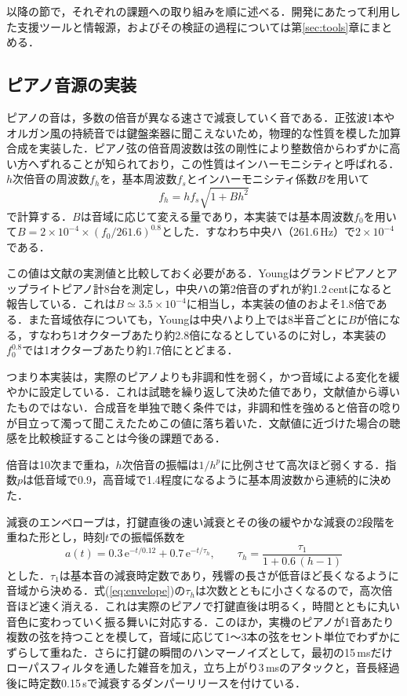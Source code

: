 \documentclass[uplatex,dvipdfmx]{jlreq}
\begin{document}
以降の節で，それぞれの課題への取り組みを順に述べる．開発にあたって利用した支援ツールと情報源，およびその検証の過程については第\ref{sec:tools}章にまとめる．

\subsection{ピアノ音源の実装}
\label{sec:piano}

ピアノの音は，多数の倍音が異なる速さで減衰していく音である．正弦波1本やオルガン風の持続音では鍵盤楽器に聞こえないため，物理的な性質を模した加算合成を実装した．ピアノ弦の倍音周波数は弦の剛性により整数倍からわずかに高い方へずれることが知られており\cite{fletcher}，この性質はインハーモニシティと呼ばれる\cite{nishiguchi}．$h$次倍音の周波数$f_h$を，基本周波数$f_s$とインハーモニシティ係数$B$を用いて
\begin{equation}
f_h = h f_s \sqrt{1 + B h^2}
\label{eq:inharmonicity}
\end{equation}
で計算する．$B$は音域に応じて変える量であり，本実装では基本周波数$f_0$を用いて$B = 2\times10^{-4} \times (f_0/261.6)^{0.8}$とした．すなわち中央ハ（261.6\,Hz）で$2\times10^{-4}$である．

この値は文献の実測値と比較しておく必要がある．Youngはグランドピアノとアップライトピアノ計8台を測定し，中央ハの第2倍音のずれが約1.2\,centになると報告している\cite{young1952}．これは$B \simeq 3.5\times10^{-4}$に相当し，本実装の値のおよそ1.8倍である．また音域依存についても，Youngは中央ハより上では8半音ごとに$B$が倍になる，すなわち1オクターブあたり約2.8倍になるとしているのに対し，本実装の$f_0^{0.8}$では1オクターブあたり約1.7倍にとどまる．

つまり本実装は，実際のピアノよりも非調和性を弱く，かつ音域による変化を緩やかに設定している．これは試聴を繰り返して決めた値であり，文献値から導いたものではない．合成音を単独で聴く条件では，非調和性を強めると倍音の唸りが目立って濁って聞こえたためこの値に落ち着いた．文献値に近づけた場合の聴感を比較検証することは今後の課題である．

倍音は10次まで重ね，$h$次倍音の振幅は$1/h^p$に比例させて高次ほど弱くする．指数$p$は低音域で0.9，高音域で1.4程度になるように基本周波数から連続的に決めた．

減衰のエンベロープは，打鍵直後の速い減衰とその後の緩やかな減衰の2段階を重ねた形とし，時刻$t$での振幅係数を
\begin{equation}
a(t) = 0.3\,\mathrm{e}^{-t/0.12} + 0.7\,\mathrm{e}^{-t/\tau_h}, \qquad
\tau_h = \frac{\tau_1}{1 + 0.6\,(h-1)}
\label{eq:envelope}
\end{equation}
とした．$\tau_1$は基本音の減衰時定数であり，残響の長さが低音ほど長くなるように音域から決める．式(\ref{eq:envelope})の$\tau_h$は次数とともに小さくなるので，高次倍音ほど速く消える．これは実際のピアノで打鍵直後は明るく，時間とともに丸い音色に変わっていく振る舞いに対応する．このほか，実機のピアノが1音あたり複数の弦を持つことを模して，音域に応じて1〜3本の弦をセント単位でわずかにずらして重ねた．さらに打鍵の瞬間のハンマーノイズとして，最初の15\,msだけローパスフィルタを通した雑音を加え，立ち上がり3\,msのアタックと，音長経過後に時定数0.15\,sで減衰するダンパーリリースを付けている．
\end{document}
